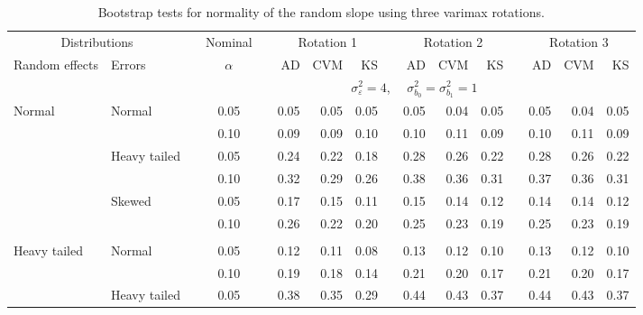 \documentclass{article} %
\begin{document}
\begin{table}[ht]
\begin{scriptsize}
\begin{center}
\begin{tabular}{ll p{.1cm} c p{.1cm} rrr p{.1cm} rrr p{.1cm} rrr}
   \hline
\end{tabular}
\end{center}
\end{scriptsize}
\end{table}

\begin{table}[ht]
\caption{Bootstrap tests for normality of the random slope using three varimax rotations.}
\begin{scriptsize}
\begin{center}
\begin{tabular}{ll p{.1cm} c p{.1cm} rrr p{.1cm} rrr p{.1cm} rrr}
  \hline
  \multicolumn{2}{c}{Distributions}& & Nominal & &  \multicolumn{3}{c}{Rotation 1} & & \multicolumn{3}{c}{Rotation 2} & & \multicolumn{3}{c}{Rotation 3}\\ \cline{1-2} \cline{6-8} \cline{10-12} \cline{14-16}
  Random effects & Errors & & $\alpha$ & & AD & CVM & KS & & AD & CVM & KS & & AD & CVM & KS \\ 
   \hline
& && && \multicolumn{9}{c}{$\sigma_{\varepsilon}^2 = 4$, \ \ $\sigma_{b_0}^2 = \sigma_{b_1}^2 = 1$} \\ \cline{6-16}
\rowcolor{gray!20}Normal       & Normal       && 0.05 &&   0.05 & 0.05 & 0.05 && 0.05 & 0.04 & 0.05 && 0.05 & 0.04 & 0.05 \\ 
\rowcolor{gray!20}             &              && 0.10 &&   0.09 & 0.09 & 0.10 && 0.10 & 0.11 & 0.09 && 0.10 & 0.11 & 0.09 \\ 
\rowcolor{gray!20}             & Heavy tailed && 0.05 &&   0.24 & 0.22 & 0.18 && 0.28 & 0.26 & 0.22 && 0.28 & 0.26 & 0.22 \\ 
\rowcolor{gray!20}             &              && 0.10 &&   0.32 & 0.29 & 0.26 && 0.38 & 0.36 & 0.31 && 0.37 & 0.36 & 0.31 \\ 
\rowcolor{gray!20}             & Skewed       && 0.05 &&   0.17 & 0.15 & 0.11 && 0.15 & 0.14 & 0.12 && 0.14 & 0.14 & 0.12 \\ 
\rowcolor{gray!20}             &              && 0.10 &&   0.26 & 0.22 & 0.20 && 0.25 & 0.23 & 0.19 && 0.25 & 0.23 & 0.19 \\ 
             &&&&&&&&&&&&&&&\\
Heavy tailed & Normal       && 0.05 &&   0.12 & 0.11 & 0.08 && 0.13 & 0.12 & 0.10 && 0.13 & 0.12 & 0.10 \\ 
             &              && 0.10 &&   0.19 & 0.18 & 0.14 && 0.21 & 0.20 & 0.17 && 0.21 & 0.20 & 0.17 \\ 
             & Heavy tailed && 0.05 &&   0.38 & 0.35 & 0.29 && 0.44 & 0.43 & 0.37 && 0.44 & 0.43 & 0.37 \\ 

\end{tabular}
\end{center}
\end{scriptsize}
\end{table}
\end{document}
